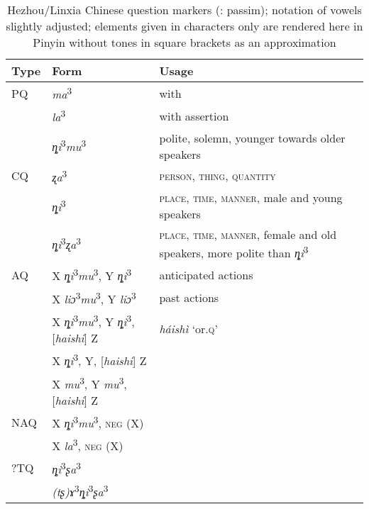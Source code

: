 \begin{table}
\caption{Hezhou/Linxia Chinese question markers (\citealt{XieZhang1990}: passim); notation of vowels slightly adjusted; elements given in characters only are rendered here in Pinyin without tones in square brackets as an approximation}
\label{tab:trans:1}

\begin{tabularx}{\textwidth}{llQ}
\lsptoprule

\textbf{Type} & \textbf{Form} & \textbf{Usage}\\
\midrule
PQ & \textit{ma}\textsuperscript{3} & with \\
& \textit{la}\textsuperscript{3} & with assertion\\
& \textit{ȵi}\textsuperscript{3}\textit{mu}\textsuperscript{3} & polite, solemn, younger towards older speakers\\
CQ & \textit{ʐa}\textsuperscript{3} & \textsc{person, thing, quantity}\\
& \textit{ȵi}\textsuperscript{3} & \textsc{place, time, manner}, male and young speakers\\
& \textit{ȵi}\textsuperscript{3}\textit{ʐa}\textsuperscript{3} & \textsc{place, time, manner}, female and old speakers, more polite than \textit{ȵi}\textsuperscript{3}\\
AQ & X \textit{ȵi}\textsuperscript{3}\textit{mu}\textsuperscript{3}, Y \textit{ȵi}\textsuperscript{3} & anticipated actions\\
& X \textit{liɔ}\textsuperscript{3}\textit{mu}\textsuperscript{3}, Y \textit{liɔ}\textsuperscript{3} & past actions\\
& X \textit{ȵi}\textsuperscript{3}\textit{mu}\textsuperscript{3}, Y \textit{ȵi}\textsuperscript{3}, [\textit{haishi}] Z &  \textit{háishì} ‘or.\textsc{q}’\\
& X \textit{ȵi}\textsuperscript{3}, Y, [\textit{haishi}] Z & \\
& X \textit{mu}\textsuperscript{3}, Y \textit{mu}\textsuperscript{3}, [\textit{haishi}] Z & \\
NAQ & X \textit{ȵi}\textsuperscript{3}\textit{mu}\textsuperscript{3}, \textsc{neg} (X) & \\
& X \textit{la}\textsuperscript{3}, \textsc{neg} (X) & \\
?TQ & \textit{ȵi}\textsuperscript{3}\textit{ʂa}\textsuperscript{3} & \\
 & \textit{(tʂ)ɤ}\textsuperscript{3}\textit{ȵi}\textsuperscript{3}\textit{ʂa}\textsuperscript{3} & \\

\end{tabularx}
\end{table}
